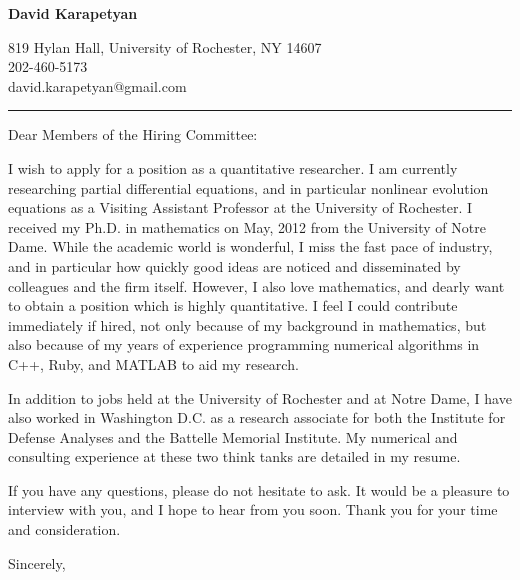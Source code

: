 \documentclass[12pt]{letter}
\date{\vspace{0.5cm}\flushleft}
\begin{document}
\begin{letter}{}
\begin{center}
{\bf {\Large David Karapetyan}}
\end{center}

\begin{center}
{819 Hylan Hall, University of Rochester, NY 14607  \\ 
202-460-5173 \\  david.karapetyan@gmail.com
}
\end{center}
\hrule

\opening{Dear Members of the Hiring Committee:\\}
%

%
I wish to apply for a position as a quantitative researcher. I am
currently researching partial differential equations, and in particular
nonlinear evolution equations as a Visiting Assistant Professor at the
University of Rochester. I received my Ph.D. in mathematics on May, 2012 from
the University of Notre Dame. While the academic world is wonderful, I miss the
fast pace of industry, and in particular how quickly good ideas are noticed and
disseminated by colleagues and the firm itself. However, I also love
mathematics, and dearly want to obtain a position which is highly quantitative.
I feel I could contribute immediately if hired, not only because of my
background in mathematics, but also because of my years of experience
programming numerical algorithms in C++, Ruby, and MATLAB to aid my research.

In addition to jobs held at the University of Rochester and at Notre Dame, I have
also worked in Washington D.C. as a research associate for both the Institute
for Defense Analyses and the Battelle Memorial Institute. My numerical and
consulting experience at these two think tanks are detailed in my resume. 

If you have any questions, please do not hesitate to ask. It would be a
pleasure to interview with you, and I hope to hear from you soon. Thank you for
your time and consideration. 

\closing{Sincerely,}


\end{letter}
\end{document}
